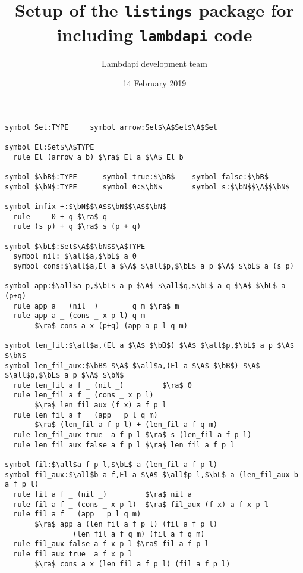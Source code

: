 \documentclass{article}
\title{Setup of the {\tt listings} package for including {\tt lambdapi} code}
\author{Lambdapi development team}
\date{14 February 2019}
\newcommand\bB{\mathbb{B}}
\newcommand\bN{\mathbb{N}}
\newcommand\bL{\mathbb{L}}
\newcommand\A\Rightarrow
\newcommand\ra\rightarrow
\newcommand\all\forall
\begin{document}
\maketitle

\small
\begin{lstlisting}[mathescape=true]
symbol Set:TYPE     symbol arrow:Set$\A$Set$\A$Set

symbol El:Set$\A$TYPE
  rule El (arrow a b) $\ra$ El a $\A$ El b

symbol $\bB$:TYPE      symbol true:$\bB$    symbol false:$\bB$
symbol $\bN$:TYPE      symbol 0:$\bN$       symbol s:$\bN$$\A$$\bN$

symbol infix +:$\bN$$\A$$\bN$$\A$$\bN$
  rule     0 + q $\ra$ q
  rule (s p) + q $\ra$ s (p + q)

symbol $\bL$:Set$\A$$\bN$$\A$TYPE
  symbol nil: $\all$a,$\bL$ a 0
  symbol cons:$\all$a,El a $\A$ $\all$p,$\bL$ a p $\A$ $\bL$ a (s p)

symbol app:$\all$a p,$\bL$ a p $\A$ $\all$q,$\bL$ a q $\A$ $\bL$ a (p+q)
  rule app a _ (nil _)        q m $\ra$ m
  rule app a _ (cons _ x p l) q m
       $\ra$ cons a x (p+q) (app a p l q m)

symbol len_fil:$\all$a,(El a $\A$ $\bB$) $\A$ $\all$p,$\bL$ a p $\A$ $\bN$
symbol len_fil_aux:$\bB$ $\A$ $\all$a,(El a $\A$ $\bB$) $\A$ $\all$p,$\bL$ a p $\A$ $\bN$
  rule len_fil a f _ (nil _)         $\ra$ 0
  rule len_fil a f _ (cons _ x p l)
       $\ra$ len_fil_aux (f x) a f p l
  rule len_fil a f _ (app _ p l q m)
       $\ra$ (len_fil a f p l) + (len_fil a f q m)
  rule len_fil_aux true  a f p l $\ra$ s (len_fil a f p l)
  rule len_fil_aux false a f p l $\ra$ len_fil a f p l

symbol fil:$\all$a f p l,$\bL$ a (len_fil a f p l)
symbol fil_aux:$\all$b a f,El a $\A$ $\all$p l,$\bL$ a (len_fil_aux b a f p l)
  rule fil a f _ (nil _)         $\ra$ nil a
  rule fil a f _ (cons _ x p l)  $\ra$ fil_aux (f x) a f x p l
  rule fil a f _ (app _ p l q m)
       $\ra$ app a (len_fil a f p l) (fil a f p l)
                (len_fil a f q m) (fil a f q m)
  rule fil_aux false a f x p l $\ra$ fil a f p l
  rule fil_aux true  a f x p l
       $\ra$ cons a x (len_fil a f p l) (fil a f p l)
\end{lstlisting}
\end{document}
